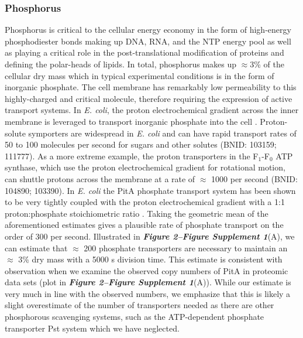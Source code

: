\subsubsection{Phosphorus}
Phosphorus is critical to the cellular energy economy in the form of
high-energy phosphodiester bonds making up DNA, RNA, and the NTP energy pool as
well as playing a critical role in the post-translational modification of
proteins and defining the polar-heads of lipids. In total, phosphorus
makes up $\approx$3\% of the cellular dry mass which in typical experimental conditions is in the form of inorganic phosphate. The cell membrane
has remarkably low permeability to this highly-charged and critical molecule,
therefore requiring the expression of active transport systems. In \textit{E. coli}, the proton
electrochemical gradient across the inner membrane is leveraged to transport
inorganic phosphate into the cell \citep{rosenberg1977}.
Proton-solute symporters are widespread in \textit{E. coli} \citep{ramos1977,
booth1979} and can have rapid transport rates of 50 to 100 molecules per second for
sugars and other solutes (BNID: 103159; 111777). As a more
extreme example, the proton transporters in the F$_1$-F$_0$ ATP synthase, which
use the proton electrochemical gradient for rotational motion, can shuttle
protons across the membrane at a rate of $\approx$ 1000 per second (BNID:
104890; 103390). In \textit{E.
coli} the PitA phosphate transport system has been shown to be very tightly coupled
with the proton electrochemical gradient with a 1:1 proton:phosphate
stoichiometric ratio \citep{harris2001, feist2007}. Taking the geometric mean of
the aforementioned estimates gives a plausible rate of phosphate transport on
the order of 300  per second. Illustrated in
\textbf{\textit{Figure 2–Figure Supplement 1}}(A), we can estimate that $\approx$ 200
phosphate transporters are necessary to maintain an $\approx$ 3\% dry mass with
a 5000 s division time. This estimate is consistent with observation when we examine the
observed copy numbers of PitA in proteomic data sets (plot in \textbf{\textit{Figure 2–Figure Supplement 1}}(A)). While our estimate is very much in line with the
observed numbers, we emphasize that this is likely a slight overestimate of the
number of transporters needed as there are other phosphorous scavenging systems,
such as the ATP-dependent phosphate transporter Pst system which we have neglected.

